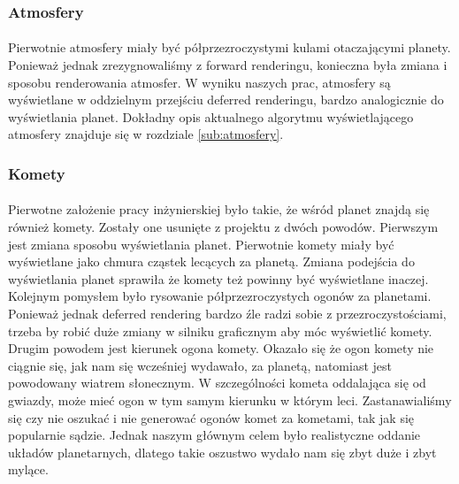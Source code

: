 \subsubsection{Atmosfery}\label{ssub:atmosfery}
\paragraph{}

Pierwotnie atmosfery miały być półprzezroczystymi kulami otaczającymi planety. Ponieważ jednak zrezygnowaliśmy z forward renderingu, konieczna była zmiana i sposobu renderowania atmosfer. W wyniku naszych prac, atmosfery są wyświetlane w oddzielnym przejściu deferred renderingu, bardzo analogicznie do wyświetlania planet. Dokładny opis aktualnego algorytmu wyświetlającego atmosfery znajduje się w rozdziale \hyperref[sub:atmosfery]{\ref{sub:atmosfery}}.

\subsubsection{Komety}\label{ssub:komety}
\paragraph{}

Pierwotne założenie pracy inżynierskiej było takie, że wśród planet znajdą się również komety. Zostały one usunięte z projektu z dwóch powodów. Pierwszym jest zmiana sposobu wyświetlania planet. Pierwotnie komety miały być wyświetlane jako chmura cząstek lecących za planetą. Zmiana podejścia do wyświetlania planet sprawiła że komety też powinny być wyświetlane inaczej. Kolejnym pomysłem było rysowanie półprzezroczystych ogonów za planetami. Ponieważ jednak deferred rendering bardzo źle radzi sobie z przezroczystościami, trzeba by robić duże zmiany w silniku graficznym aby móc wyświetlić komety. Drugim powodem jest kierunek ogona komety. Okazało się że ogon komety nie ciągnie się, jak nam się wcześniej wydawało, za planetą, natomiast jest powodowany wiatrem słonecznym. W szczególności kometa oddalająca się od gwiazdy, może mieć ogon w tym samym kierunku w którym leci. Zastanawialiśmy się czy nie oszukać i nie generować ogonów komet za kometami, tak jak się popularnie sądzie. Jednak naszym głównym celem było realistyczne oddanie układów planetarnych, dlatego takie oszustwo wydało nam się zbyt duże i zbyt mylące.

\paragraph{}

